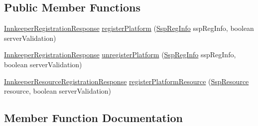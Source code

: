 \subsection*{Public Member Functions}
\begin{DoxyCompactItemize}
\item 
\hyperlink{classeu_1_1h2020_1_1symbiote_1_1ssp_1_1model_1_1InnkeeperRegistrationResponse}{Innkeeper\+Registration\+Response} \hyperlink{interfaceeu_1_1h2020_1_1symbiote_1_1client_1_1ssp_1_1interfaces_1_1InnkeeperClient_acef29ffd0a9e52784f95e3a223eca0b9}{register\+Platform} (\hyperlink{classeu_1_1h2020_1_1symbiote_1_1cloud_1_1model_1_1ssp_1_1SspRegInfo}{Ssp\+Reg\+Info} ssp\+Reg\+Info, boolean server\+Validation)
\item 
\hyperlink{classeu_1_1h2020_1_1symbiote_1_1ssp_1_1model_1_1InnkeeperRegistrationResponse}{Innkeeper\+Registration\+Response} \hyperlink{interfaceeu_1_1h2020_1_1symbiote_1_1client_1_1ssp_1_1interfaces_1_1InnkeeperClient_a9f8da16b1de6aef89ae679dca5a9592c}{unregister\+Platform} (\hyperlink{classeu_1_1h2020_1_1symbiote_1_1cloud_1_1model_1_1ssp_1_1SspRegInfo}{Ssp\+Reg\+Info} ssp\+Reg\+Info, boolean server\+Validation)
\item 
\hyperlink{classeu_1_1h2020_1_1symbiote_1_1ssp_1_1model_1_1InnkeeperResourceRegistrationResponse}{Innkeeper\+Resource\+Registration\+Response} \hyperlink{interfaceeu_1_1h2020_1_1symbiote_1_1client_1_1ssp_1_1interfaces_1_1InnkeeperClient_aaa37ea24e8ab9dcb7daa1ab2a7ec0757}{register\+Platform\+Resource} (\hyperlink{classeu_1_1h2020_1_1symbiote_1_1cloud_1_1model_1_1ssp_1_1SspResource}{Ssp\+Resource} resource, boolean server\+Validation)
\end{DoxyCompactItemize}


\subsection{Member Function Documentation}
\mbox{\label{interfaceeu_1_1h2020_1_1symbiote_1_1client_1_1ssp_1_1interfaces_1_1InnkeeperClient_acef29ffd0a9e52784f95e3a223eca0b9}} 
